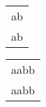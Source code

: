 \begin{tabular}{|l|} \hline
ab \\
ab \\
\hline
\end{tabular} 
\begin{tabular}{|l|} \hline
aabb \\
aabb \\
\hline
\end{tabular} 
